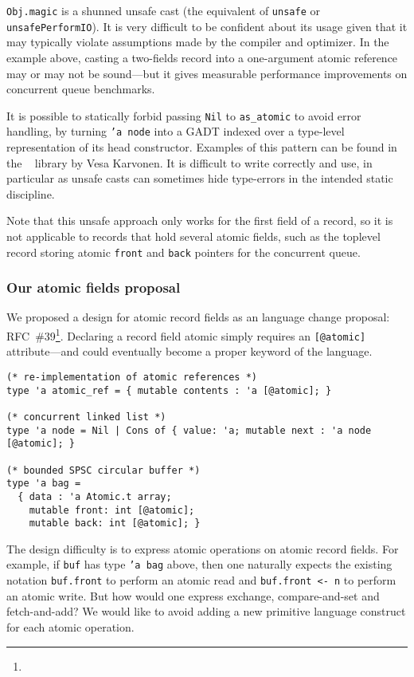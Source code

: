 \texttt{Obj.magic} is a shunned unsafe cast (the \OCaml equivalent of \texttt{unsafe} or \texttt{unsafePerformIO}).
It is very difficult to be confident about its usage given that it may typically violate assumptions made by the \OCaml compiler and optimizer.
In the example above, casting a two-fields record into a one-argument atomic reference may or may not be sound---but it gives measurable performance improvements on concurrent queue benchmarks.

It is possible to statically forbid passing \texttt{Nil} to \texttt{as_atomic} to avoid error handling, by turning \texttt{'a node} into a GADT indexed over a type-level representation of its head constructor.
Examples of this pattern can be found in the \Kcas~\cite{kcas} library by Vesa Karvonen.
It is difficult to write correctly and use, in particular as unsafe casts can sometimes hide type-errors in the intended static discipline.

Note that this unsafe approach only works for the first field of a record, so it is not applicable to records that hold several atomic fields, such as the toplevel record storing atomic \texttt{front} and \texttt{back} pointers for the concurrent queue.

\subsubsection{Our atomic fields proposal}

We proposed a design for atomic record fields as an \OCaml language change proposal: RFC~\#39\footnote{}.
Declaring a record field atomic simply requires an \texttt{[@atomic]} attribute---and could eventually become a proper keyword of the language.

\begin{verbatim}
(* re-implementation of atomic references *)
type 'a atomic_ref = { mutable contents : 'a [@atomic]; }

(* concurrent linked list *)
type 'a node = Nil | Cons of { value: 'a; mutable next : 'a node [@atomic]; }

(* bounded SPSC circular buffer *)
type 'a bag =
  { data : 'a Atomic.t array;
    mutable front: int [@atomic];
    mutable back: int [@atomic]; }
\end{verbatim}

The design difficulty is to express atomic operations on atomic record fields.
For example, if \texttt{buf} has type \texttt{'a bag} above, then one naturally expects the existing notation \texttt{buf.front} to perform an atomic read and \texttt{buf.front <- n} to perform an atomic write.
But how would one express exchange, compare-and-set and fetch-and-add?
We would like to avoid adding a new primitive language construct for each atomic operation.

